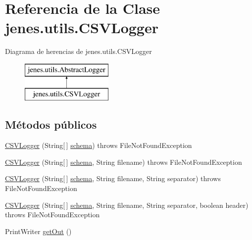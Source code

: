 \hypertarget{classjenes_1_1utils_1_1_c_s_v_logger}{\section{Referencia de la Clase jenes.\-utils.\-C\-S\-V\-Logger}
\label{classjenes_1_1utils_1_1_c_s_v_logger}
}
Diagrama de herencias de jenes.\-utils.\-C\-S\-V\-Logger\begin{figure}[H]
\begin{center}
\leavevmode
\includegraphics[height=2.000000cm]{classjenes_1_1utils_1_1_c_s_v_logger}
\end{center}
\end{figure}
\subsection*{Métodos públicos}
\begin{DoxyCompactItemize}
\item 
\hyperlink{classjenes_1_1utils_1_1_c_s_v_logger_a8cac9e217f74d86b4e26b025d8e1381c}{C\-S\-V\-Logger} (String\mbox{[}$\,$\mbox{]} \hyperlink{classjenes_1_1utils_1_1_abstract_logger_a3a2030876857a0512fae7e0ad400c570}{schema})  throws File\-Not\-Found\-Exception 
\item 
\hyperlink{classjenes_1_1utils_1_1_c_s_v_logger_a52ccc76492a8a16e018198bcfa702360}{C\-S\-V\-Logger} (String\mbox{[}$\,$\mbox{]} \hyperlink{classjenes_1_1utils_1_1_abstract_logger_a3a2030876857a0512fae7e0ad400c570}{schema}, String filename)  throws File\-Not\-Found\-Exception 
\item 
\hyperlink{classjenes_1_1utils_1_1_c_s_v_logger_ad6242d77cf75372bfbf55e9b0973bfb4}{C\-S\-V\-Logger} (String\mbox{[}$\,$\mbox{]} \hyperlink{classjenes_1_1utils_1_1_abstract_logger_a3a2030876857a0512fae7e0ad400c570}{schema}, String filename, String separator)  throws File\-Not\-Found\-Exception 
\item 
\hyperlink{classjenes_1_1utils_1_1_c_s_v_logger_ad39241223c9d49bfa34a21db4aa1f8b1}{C\-S\-V\-Logger} (String\mbox{[}$\,$\mbox{]} \hyperlink{classjenes_1_1utils_1_1_abstract_logger_a3a2030876857a0512fae7e0ad400c570}{schema}, String filename, String separator, boolean header)  throws File\-Not\-Found\-Exception 
\item 
Print\-Writer \hyperlink{classjenes_1_1utils_1_1_c_s_v_logger_a00671f9154ae65398d676e6526fa08f2}{get\-Out} ()
\end{DoxyCompactItemize}
